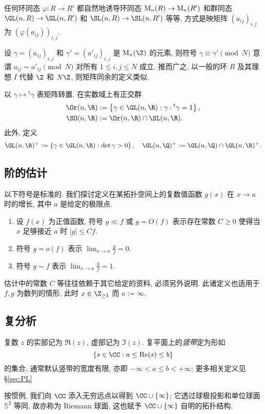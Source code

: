 任何环同态 $\varphi: R \to R'$ 都自然地诱导环同态 $\operatorname{M}_n(R) \to \operatorname{M}_n(R')$ 和群同态 $\GL(n, R) \to \GL(n, R')$ 和 $\SL(n,R) \to \SL(n,R')$ 等等, 方式是映矩阵 $(a_{ij})_{i,j}$ 为 $(\varphi(a_{ij}))_{i,j}$.

设 $\gamma = (a_{ij})_{i,j}$ 和 $\gamma' = (a'_{ij})_{i,j}$ 是 $\Mat_n(\Z)$ 的元素, 则符号 $\gamma \equiv \gamma' \pmod{N}$ 意谓 $a_{ij} = a'_{ij} \pmod{N}$ 对所有 $1 \leq i,j \leq N$ 成立. 推而广之, 以一般的环 $R$ 及其理想 $I$ 代替 $\Z$ 和 $N\Z$, 则矩阵同余的定义类似.

以 $\gamma \mapsto {}^t \gamma$ 表矩阵转置. 在实数域上有正交群
\begin{align*}
	\Or(n,\R) & := \left\{ \gamma \in \GL(n,\R) : \gamma \cdot {}^t \gamma = 1 \right\}, \\
	\SO(n,\R) & := \Or(n, \R) \cap \SL(n,\R).
\end{align*}
此外, 定义 
\[ \GL(n,\R)^+ := \left\{ \gamma \in \GL(n,\R) : \det\gamma > 0 \right\}, \quad \GL(n,\Q)^+ := \GL(n,\Q) \cap \GL(n,\R)^+. \]

\subsection*{阶的估计}
以下符号是标准的. 我们探讨定义在某拓扑空间上的复数值函数 $g(x)$ 在 $x \to a$ 时的增长, 其中 $a$ 是给定的极限点.
\begin{enumerate}
	\item 设 $f(x)$ 为正值函数, 符号 $g \ll f$ 或 $g = O(f)$ 表示存在常数 $C \geq 0$ 使得当 $x$ 足够接近 $a$ 时 $|g| \leq C f$.
	\item 符号 $g = o(f)$ 表示 $\lim_{x \to a} \frac{g}{f} = 0$.
	\item 符号 $g \sim f$ 表示 $\lim_{x \to a} \frac{g}{f} = 1$.
\end{enumerate}

估计中的常数 $C$ 等往往依赖于其它给定的资料, 必须另外说明. 此诸定义也适用于 $f, g$ 为数列的情形, 此时 $x \in \Z_{\geq 1}$ 而 $a := \infty$.

\subsection*{复分析}
复数 $z$ 的实部记为 $\Re(z)$, 虚部记为 $\Im(z)$. 复平面上的\emph{竖带}定为形如
\[ \left\{s \in \CC : a \leq \Re(s) \leq b \right\} \]
的集合, 通常默认竖带的宽度有限, 亦即 $-\infty < a \leq b < +\infty$; 更多相关定义见 \S\ref{sec:PL}

按惯例, 我们向 $\CC$ 添入无穷远点以得到 $\CC \sqcup \{\infty\}$; 它透过球极投影和单位球面 $\mathbb{S}^2$ 等同, 故亦称为 Riemann 球面, 这也赋予 $\CC \sqcup \{\infty\}$ 自明的拓扑结构.

